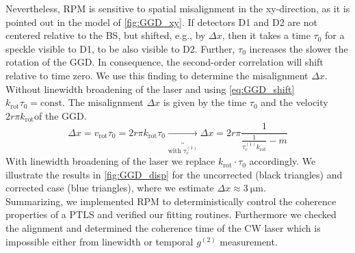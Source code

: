 \noindent Nevertheless, \ac{RPM} is sensitive to spatial misalignment in the xy-direction, as it is pointed out in the model of \cref{fig:GGD_xy}. If detectors D1 and D2 are not centered relative to the \ac{BS}, but shifted, e.g., by $\Delta x$, then it takes a time $\tau_0$ for a speckle visible to D1, to be also visible to D2. Further, $\tau_0$ increases the slower the rotation of the \ac{GGD}. In consequence, the second-order correlation will shift relative to time zero. We use this finding to determine the misalignment $\Delta x$. Without linewidth broadening of the laser and using \cref{eq:GGD_shift} $k_\mathrm{rot}\tau_0=\textrm{const}$. The misalignment $\Delta x$ is given by the time $\tau_0$ and the velocity $2r\pi k_\mathrm{rot}$of the \ac{GGD}.
\begin{equation}\label{eq:shift}
	\Delta x=v_\mathrm{rot}\tau_0=2r\pi k_\mathrm{rot}\tau_0\underbracket{\rightarrow}_\textrm{with $\tau_c^{(1)}$}\Delta x=2r\pi \dfrac{1}{\frac{1}{\tau_c^{(1)}k_\mathrm{rot}}-m}
\end{equation} 
With linewidth broadening of the laser we replace $k_\mathrm{rot}\cdot\tau_0$ accordingly. We illustrate the results in \cref{fig:GGD_disp} for the uncorrected (black triangles) and corrected case (blue triangles), where we estimate $\Delta x\approx\SI{3}{\um}$.\\
Summarizing, we implemented \ac{RPM} to deterministically control the coherence properties of a \ac{PTLS} and verified our fitting routines. Furthermore we checked the alignment and determined the coherence time of the \ac{CW} laser which is impossible either from linewidth or temporal $g^{(2)}$ measurement.

